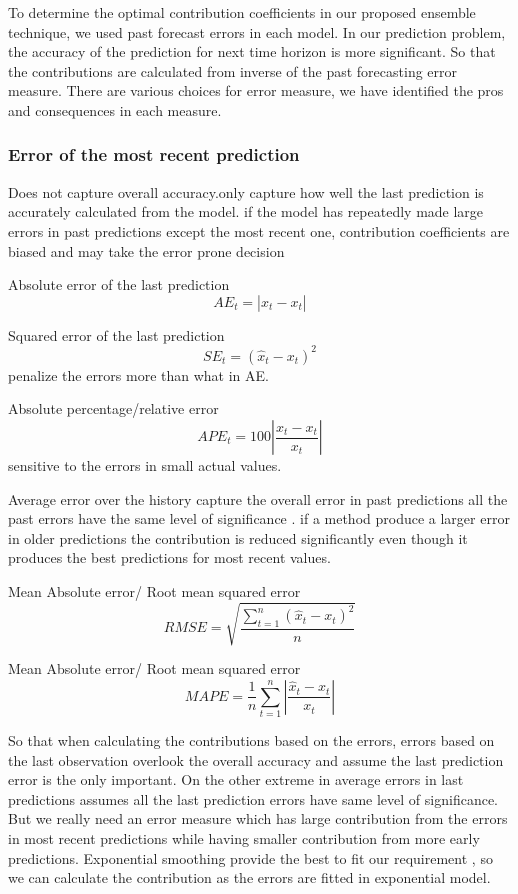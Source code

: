 To determine the optimal contribution coefficients in our proposed ensemble technique,  we used past forecast errors in each model. In our prediction problem, the accuracy of the prediction for next time horizon is more significant. So that the  contributions are calculated from inverse of the past forecasting error measure. There are various choices for error measure,  we have identified the pros and consequences in each measure. 

\subsubsection{Error of the most recent prediction}

Does not capture overall accuracy.only capture how well the last prediction is accurately calculated from the model. if the model has repeatedly made large errors in past predictions except the most recent one, contribution coefficients are biased and may take the error prone decision

Absolute error of the last prediction
$$AE_t=|\hat{x}_t-x_t|$$

Squared error of the last prediction
$$SE_t=(\hat{x}_t-x_t)^2$$
penalize the errors more than what in AE.

Absolute percentage/relative error
$$APE_t=100\left |\frac{\hat{x}_t-x_t}{x_t}  \right |$$
sensitive to the errors in small actual values. 
		
Average error over the history
capture the overall error in past predictions all the past errors have the same level of significance . if a method produce a larger error in older predictions  the contribution is reduced significantly even though it produces the best predictions for most recent values.

Mean Absolute error/ Root mean squared error
$$RMSE=\sqrt{\frac{\sum_{t=1}^{n}(\hat{x}_{t}-x_{t})^{2}}{n}}$$ 

Mean Absolute error/ Root mean squared error
$$ MAPE=\frac{1}{n}\sum_{t=1}^{n}\left | \frac{\hat{x}_{t}-x_{t}}{x_{t}} \right |$$

So that when calculating the contributions based on the errors, errors based on the last observation overlook the overall accuracy and assume the last prediction error is the only important. On the other extreme in average errors in last predictions assumes all the last prediction errors have same level of significance. But we really need an error measure which has large contribution from the errors in most recent predictions while having smaller contribution from more early predictions. Exponential smoothing provide the best to fit our requirement , so we can calculate the contribution as the errors are fitted in exponential model.

